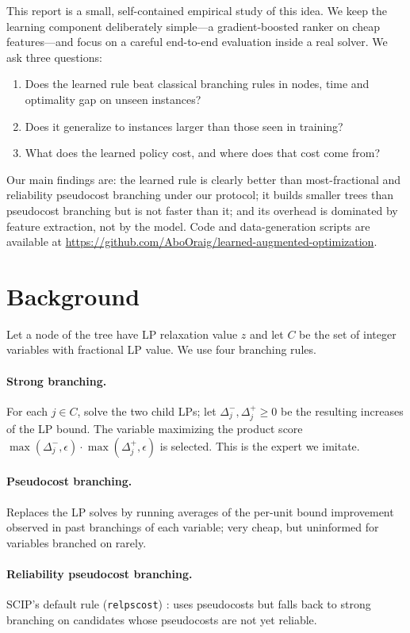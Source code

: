 \documentclass[11pt,a4paper]{article}
\newcommand{\sbr}[1]{\texttt{#1}}
\begin{document}
This report is a small, self-contained empirical study of this idea. We keep the learning component deliberately simple---a gradient-boosted ranker on cheap features---and focus on a careful end-to-end evaluation inside a real solver. We ask three questions:
\begin{enumerate}
  \item[\textbf{Q1}] Does the learned rule beat classical branching rules in nodes, time and optimality gap on unseen instances?
  \item[\textbf{Q2}] Does it generalize to instances larger than those seen in training?
  \item[\textbf{Q3}] What does the learned policy cost, and where does that cost come from?
\end{enumerate}
Our main findings are: the learned rule is clearly better than most-fractional and reliability pseudocost branching under our protocol; it builds smaller trees than pseudocost branching but is not faster than it; and its overhead is dominated by feature extraction, not by the model. Code and data-generation scripts are available at \url{https://github.com/AboOraig/learned-augmented-optimization}.
 
\section{Background}
Let a node of the tree have LP relaxation value $z$ and let $C$ be the set of integer variables with fractional LP value. We use four branching rules.
\paragraph{Strong branching.} For each $j\in C$, solve the two child LPs; let $\Delta_j^-,\Delta_j^+\ge 0$ be the resulting increases of the LP bound. The variable maximizing the product score $\max(\Delta_j^-,\epsilon)\cdot\max(\Delta_j^+,\epsilon)$ is selected. This is the expert we imitate.
\paragraph{Pseudocost branching.} Replaces the LP solves by running averages of the per-unit bound improvement observed in past branchings of each variable; very cheap, but uninformed for variables branched on rarely.
\paragraph{Reliability pseudocost branching.} SCIP's default rule (\sbr{relpscost}) \citep{achterberg2005branching}: uses pseudocosts but falls back to strong branching on candidates whose pseudocosts are not yet reliable.
\end{document}
